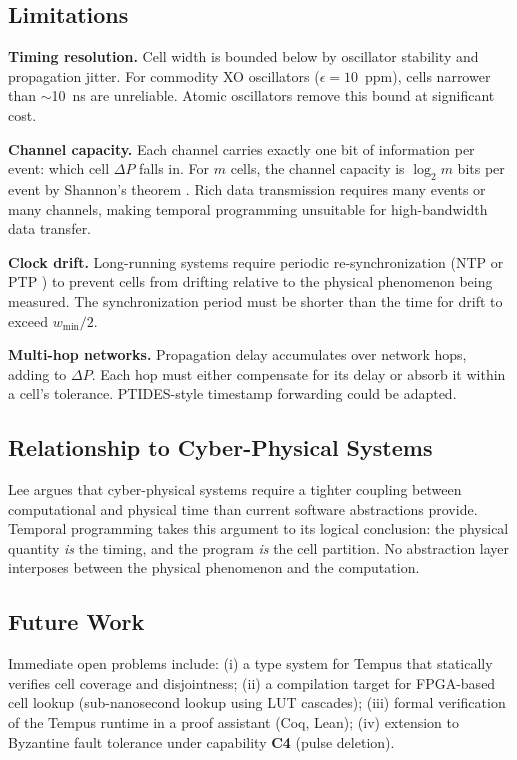 \documentclass[twocolumn,10pt]{article}
\newcommand{\DP}{\Delta P}          %
\begin{document}
\subsection{Limitations}

\textbf{Timing resolution.} Cell width is bounded below by oscillator
stability and propagation jitter. For commodity XO oscillators
($\epsilon = 10$~ppm), cells narrower than $\sim$10~ns are
unreliable. Atomic oscillators remove this bound at significant cost.

\textbf{Channel capacity.} Each channel carries exactly one bit of
information per event: which cell $\DP$ falls in. For $m$ cells,
the channel capacity is $\log_2 m$ bits per event by Shannon's
theorem \cite{shannon1948communication}. Rich data transmission
requires many events or many channels, making temporal programming
unsuitable for high-bandwidth data transfer.

\textbf{Clock drift.} Long-running systems require periodic
re-synchronization (NTP \cite{mills1991ntp} or PTP
\cite{ieee1588}) to prevent cells from drifting relative to the
physical phenomenon being measured. The synchronization period must
be shorter than the time for drift to exceed $w_{\min}/2$.

\textbf{Multi-hop networks.} Propagation delay accumulates over
network hops, adding to $\DP$. Each hop must either compensate for
its delay or absorb it within a cell's tolerance. PTIDES-style
timestamp forwarding \cite{zhao2007ptides} could be adapted.

\subsection{Relationship to Cyber-Physical Systems}

Lee \cite{lee2008cyber} argues that cyber-physical systems require
a tighter coupling between computational and physical time than
current software abstractions provide. Temporal programming takes
this argument to its logical conclusion: the physical quantity
\emph{is} the timing, and the program \emph{is} the cell partition.
No abstraction layer interposes between the physical phenomenon and
the computation.

\subsection{Future Work}

Immediate open problems include: (i) a type system for Tempus that
statically verifies cell coverage and disjointness; (ii) a compilation
target for FPGA-based cell lookup (sub-nanosecond lookup using LUT
cascades); (iii) formal verification of the Tempus runtime in a
proof assistant (Coq, Lean); (iv) extension to Byzantine fault
tolerance under capability \textbf{C4} (pulse deletion).
\end{document}
